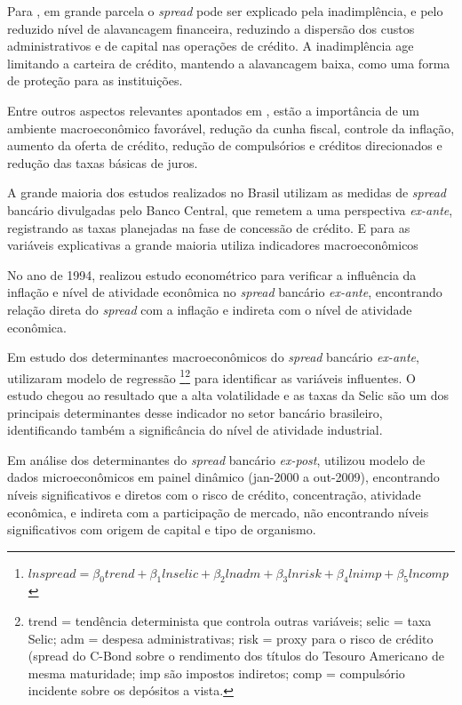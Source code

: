 \documentclass[
  12pt,
  12pt,
  openright,
  oneside,
  a4paper,
  chapter=TITLE,
  section=TITLE,
  subsection=TITLE,
  subsubsection=TITLE,
  portugues,
  sumario=tradicional]{abntex2}
\begin{document}
Para \textcite{BCB:1999}, em grande parcela o \emph{spread} pode ser explicado pela inadimplência, e pelo reduzido nível de alavancagem financeira, reduzindo a dispersão dos custos administrativos e de capital nas operações de crédito. A inadimplência age limitando a carteira de crédito, mantendo a alavancagem baixa, como uma forma de proteção para as instituições.

Entre outros aspectos relevantes apontados em \textcite{BCB:1999}, estão a importância de um ambiente macroeconômico favorável, redução da cunha fiscal, controle da inflação, aumento da oferta de crédito, redução de compulsórios e créditos direcionados e redução das taxas básicas de juros.

A grande maioria dos estudos realizados no Brasil utilizam as medidas de
\emph{spread} bancário divulgadas pelo Banco Central, que remetem a uma perspectiva
\emph{ex-ante}, registrando as taxas planejadas na fase de concessão de crédito. E
para as variáveis explicativas a grande maioria utiliza indicadores
macroeconômicos \cite{dantas:2012}

No ano de 1994, \textcite{aronovich:1994} realizou estudo econométrico para
verificar a influência da inflação e nível de atividade econômica no \emph{spread}
bancário \emph{ex-ante}, encontrando relação direta do \emph{spread} com a inflação e
indireta com o nível de atividade econômica.

Em estudo dos determinantes macroeconômicos do \emph{spread} bancário \emph{ex-ante}, \textcite{oreiro-2006} utilizaram modelo de regressão \footnote{$ln spread = \beta_0 trend + \beta_1 ln selic + \beta_2 ln adm + \beta_3 ln risk + \beta_4 ln imp + \beta_5 ln comp$}\footnote{trend = tendência determinista que controla outras variáveis; selic = taxa Selic; adm = despesa administrativas; risk =  proxy para o risco de crédito (spread do C-Bond sobre o rendimento dos títulos do Tesouro Americano de mesma maturidade; imp são impostos indiretos; comp = compulsório incidente sobre os depósitos a vista.} para identificar as variáveis influentes. O estudo chegou ao resultado que a alta volatilidade e as taxas da Selic são um dos principais determinantes desse indicador no setor bancário brasileiro, identificando também a significância do nível de atividade industrial.

Em análise dos determinantes do \emph{spread} bancário \emph{ex-post}, \textcite{dantas:2012} utilizou modelo de dados microeconômicos em painel dinâmico (jan-2000 a out-2009), encontrando níveis significativos e diretos com o risco de crédito, concentração, atividade econômica, e indireta com a participação de mercado, não encontrando níveis significativos com origem de capital e tipo de organismo.
\end{document}
